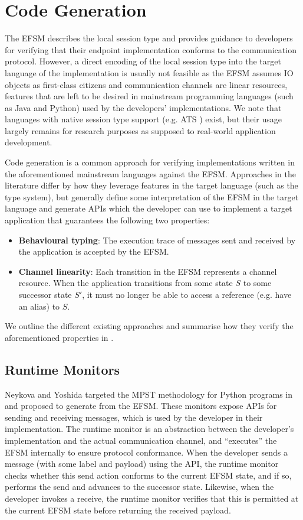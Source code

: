 \section{Code Generation}
The EFSM describes the local session type and provides guidance to developers for verifying that their endpoint implementation conforms to the communication protocol. However, a direct encoding of the local session type into the target language of the implementation is usually not feasible as the EFSM assumes IO objects as first-class citizens and communication channels are linear resources, features that are left to be desired in mainstream programming languages (such as Java and Python) used by the developers' implementations. We note that languages with native session type support (e.g. ATS \cite{ATS2016}) exist, but their usage largely remains for research purposes as supposed to real-world application development.

Code generation is a common approach for verifying implementations written in the aforementioned mainstream languages against the EFSM. Approaches in the literature differ by how they leverage features in the target language (such as the type system), but generally define some interpretation of the EFSM in the target language and generate APIs which the developer can use to implement a target application that guarantees the following two properties:

\begin{itemize}
\item \textbf{Behavioural typing}: The execution trace of messages sent and received by the application is accepted by the EFSM.
\item \textbf{Channel linearity}: Each transition in the EFSM represents a channel resource. When the application transitions from some state $S$ to some successor state $S'$, it must no longer be able to access a reference (e.g. have an alias) to $S$.
\end{itemize}

We outline the different existing approaches and summarise how they verify the aforementioned properties in \mathref{\ref{section:codegencompare}}.

\subsection{Runtime Monitors}
Neykova and Yoshida targeted the MPST methodology for Python programs in \cite{Python2017} and proposed to generate  from the EFSM. These monitors expose APIs for sending and receiving messages, which is used by the developer in their implementation. The runtime monitor is an abstraction between the developer's implementation and the actual communication channel, and ``executes'' the EFSM internally to ensure protocol conformance. When the developer sends a message (with some label and payload) using the API, the runtime monitor checks whether this send action conforms to the current EFSM state, and if so, performs the send and advances to the successor state. Likewise, when the developer invokes a receive, the runtime monitor verifies that this is permitted at the current EFSM state before returning the received payload.

